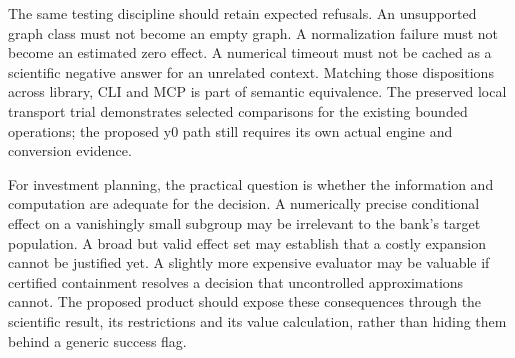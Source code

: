 The same testing discipline should retain expected refusals. An
unsupported graph class must not become an empty graph. A normalization
failure must not become an estimated zero effect. A numerical timeout
must not be cached as a scientific negative answer for an unrelated
context. Matching those dispositions across library, CLI and MCP is part
of semantic equivalence. The preserved local transport trial
demonstrates selected comparisons for the existing bounded operations;
the proposed y0 path still requires its own actual engine and conversion
evidence. \citep{exec13_interchange_runtime}

For investment planning, the practical question is whether the
information and computation are adequate for the decision. A numerically
precise conditional effect on a vanishingly small subgroup may be
irrelevant to the bank's target population. A broad but valid effect set
may establish that a costly expansion cannot be justified yet. A
slightly more expensive evaluator may be valuable if certified
containment resolves a decision that uncontrolled approximations cannot.
The proposed product should expose these consequences through the
scientific result, its restrictions and its value calculation, rather
than hiding them behind a generic success flag.
\label{exec13:interchange-complete-end}
